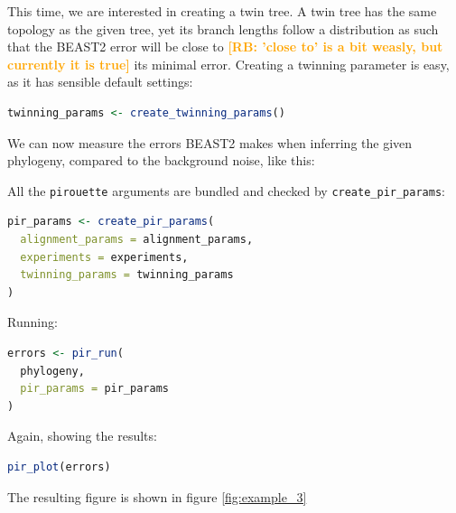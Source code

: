 \documentclass{article}
\newcommand{\richel}[1]{\textcolor{orange}{\textbf{[RB: #1]}}}
\begin{document}
This time, we are interested in creating a twin tree. A twin tree
has the same topology as the given tree, yet its branch lengths follow
a distribution as such that the BEAST2 error will be 
close to \richel{'close to' is a bit weasly, but currently it is true}
its minimal error.
Creating a twinning parameter is easy,
as it has sensible default settings:

\begin{lstlisting}[language=R, floatplacement=H, frame=single]
twinning_params <- create_twinning_params()
\end{lstlisting}

We can now measure the errors BEAST2
makes when inferring the given phylogeny, compared
to the background noise, like this:

All the \verb;pirouette; arguments are bundled
and checked by \verb;create_pir_params;:

\begin{lstlisting}[language=R, floatplacement=H, frame=single]
pir_params <- create_pir_params(
  alignment_params = alignment_params,
  experiments = experiments,
  twinning_params = twinning_params
)
\end{lstlisting}

Running:

\begin{lstlisting}[language=R, floatplacement=H, frame=single]
errors <- pir_run(
  phylogeny,
  pir_params = pir_params
)
\end{lstlisting}

Again, showing the results:

\begin{lstlisting}[language=R, floatplacement=H, frame=single]
pir_plot(errors)
\end{lstlisting}

The resulting figure is shown in figure \ref{fig:example_3}
\end{document}
